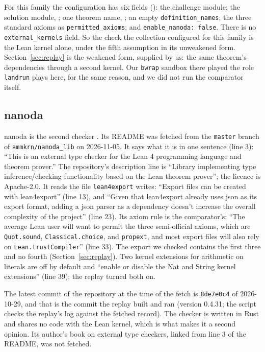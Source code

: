 For this family the configuration has six fields
(): the
challenge module; the solution module,
; one theorem name,
; an empty
\texttt{definition\_names}; the three standard axioms as
\texttt{permitted\_axioms}; and \texttt{enable\_nanoda: false}. There is
no \texttt{external\_kernels} field. So the check the collection
configured for this family is the Lean kernel alone, under the fifth
assumption in its unweakened form. Section~\ref{sec:replay} is the
weakened form, supplied by us: the same theorem's dependencies through a
second kernel. Our \texttt{bwrap} sandbox there played the role
\texttt{landrun} plays here, for the same reason, and we did not run the
comparator itself.

\subsection{nanoda}
\label{sec:related-nanoda}

nanoda is the second checker \citep{Nanoda}. Its README was fetched from
the \texttt{master} branch of \texttt{ammkrn/nanoda\_lib} on 2026-11-05.
It says what it is in one sentence (line 3): ``This is an external type
checker for the Lean 4 programming language and theorem prover.'' The
repository's description line is ``Library implementing type
inference/checking functionality based on the Lean theorem prover''; the
licence is Apache-2.0. It reads the file \texttt{lean4export} writes:
``Export files can be created with lean4export'' (line 13), and ``Given
that lean4export already uses json as its export format, adding a json
parser as a dependency doesn't increase the overall complexity of the
project'' (line 23). Its axiom rule is the comparator's: ``The average
Lean user will want to permit the three semi-official axioms, which are
\texttt{Quot.sound}, \texttt{Classical.choice}, and \texttt{propext}, and
most export files will also rely on \texttt{Lean.trustCompiler}'' (line
33). The export we checked contains the first three and no fourth
(Section~\ref{sec:replay}). Two kernel extensions for arithmetic on
literals are off by default and ``enable or disable the Nat and String
kernel extensions'' (line 39); the replay turned both on.

The latest commit of the repository at the time of the fetch is
\texttt{8de7e0c4} of 2026-10-29, and that is the commit the replay built
and ran (version 0.4.31; the script checks the replay's log against the
fetched record). The checker is written in Rust and shares no code with
the Lean kernel, which is what makes it a second opinion. Its author's
book on external type checkers, linked from line 3 of the README, was not
fetched.

